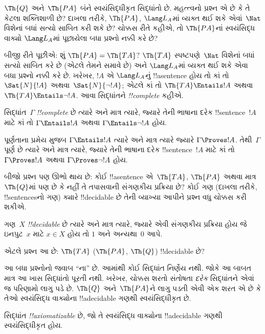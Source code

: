 \documentclass[../../../include/open-logic-section]{subfiles}
\begin{document}
$\Th{Q}$ અને~$\Th{PA}$ બંને
સ્વયંસિદ્ધીકૃત સિદ્ધાંતો છે. મહત્ત્વનો પ્રશ્ન
એ છે કે તે કેટલા શક્તિશાળી છે? દાખલા તરીકે,
$\Th{PA}$, $\Lang L_A$માં વ્યક્ત થઈ શકે
એવાં~$\Nat$ વિશેનાં બધાં સત્યો સાબિત કરી
શકે છે? ચોક્કસ રીતે કહીએ, તો
$\Th{PA}$નાં સ્વયંસિદ્ધ વાક્યો
$\Lang L_A$માં પૂછાયેલા બધા પ્રશ્નો
નક્કી કરે છે?

બીજી રીતે પૂછીએ: શું $\Th{PA} = \Th{TA}$?
$\Th{TA}$ સ્પષ્ટપણે~$\Nat$ વિશેનાં બધાં
સત્યો સાબિત કરે છે (એટલે તેમને સમાવે છે) અને
$\Lang L_A$માં વ્યક્ત થઈ શકે એવા બધા
પ્રશ્નો નક્કી કરે છે. ખરેખર, $!A$ એ
$\Lang L_A$નું !!a{sentence} હોય તો કાં તો
$\Sat{N}{!A}$ અથવા~$\Sat{N}{\lnot !A}$;
એટલે કાં તો $\Th{TA} \Entails !A$ અથવા
$\Th{TA} \Entails \lnot !A$. આવા સિદ્ધાંતને
\emph{!!{complete}} કહીએ.

\begin{defn}
સિદ્ધાંત~$\Gamma$ \emph{!!{complete}} છે
ત્યારે અને માત્ર ત્યારે, જ્યારે તેની ભાષાના
દરેક !!{sentence}~$!A$ માટે કાં તો
$\Gamma \Entails !A$ અથવા
$\Gamma \Entails \lnot !A$ હોય.
\end{defn}

\begin{explain}
પૂર્ણતાના પ્રમેય મુજબ
$\Gamma \Entails !A$ ત્યારે અને માત્ર ત્યારે
જ્યારે $\Gamma \Proves !A$. તેથી~$\Gamma$
પૂર્ણ છે ત્યારે અને માત્ર ત્યારે, જ્યારે
તેની ભાષાના દરેક !!{sentence}~$!A$ માટે
કાં તો $\Gamma \Proves !A$ અથવા
$\Gamma \Proves \lnot !A$ હોય.
\end{explain}

બીજો પ્રશ્ન પણ ઊભો થાય છે: કોઈ
!!a{sentence} એ~$\Th{TA}$, $\Th{PA}$
અથવા માત્ર~$\Th{Q}$માં પણ છે કે નહીં તે
તપાસવાની સંગણકીય પ્રક્રિયા છે? કોઈ ગણ
(દાખલા તરીકે, !!{sentence}sનો ગણ)
ક્યારે !!{decidable} છે તેની વ્યાખ્યા
આપીને પ્રશ્ન વધુ ચોક્કસ કરી શકીએ.

\begin{defn}
ગણ~$X$ \emph{!!{decidable}} છે ત્યારે
અને માત્ર ત્યારે, જ્યારે એવી સંગણકીય પ્રક્રિયા
હોય જે ઇનપુટ~$x$ માટે $x \in X$ હોય તો
$1$ અને અન્યથા~$0$ આપે.
\end{defn}

એટલે પ્રશ્ન આ છે: $\Th{TA}$
($\Th{PA}$, $\Th{Q}$) !!{decidable} છે?

આ બધા પ્રશ્નોનો જવાબ ``ના'' છે. આમાંથી
કોઈ સિદ્ધાંત નિર્ણેય નથી. જોકે આ બાબત માત્ર
આ ખાસ સિદ્ધાંતો પૂરતી નથી. ખરેખર,
ચોક્કસ શરતો સંતોષતા \emph{દરેક} સિદ્ધાંતને
એવાં જ પરિણામો લાગુ પડે છે. $\Th{Q}$
અને~$\Th{PA}$ને લાગુ પડતી એવી એક શરત
એ છે કે તેઓ સ્વયંસિદ્ધ વાક્યોના
!!a{decidable} ગણથી સ્વયંસિદ્ધીકૃત છે.

\begin{defn}
સિદ્ધાંત \emph{!!{axiomatizable}} છે, જો
તે સ્વયંસિદ્ધ વાક્યોના !!a{decidable} ગણથી
સ્વયંસિદ્ધીકૃત હોય.
\end{defn}
\end{document}
